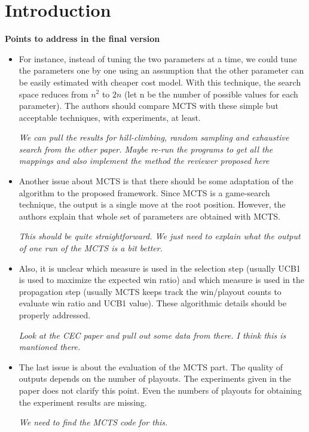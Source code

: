\documentclass[smallextended]{svjour3}
\begin{document}
\section{Introduction}

\textbf{Points to address in the final version}
\begin{itemize}
    \item For instance, instead of tuning the two parameters at a time, we could tune the parameters one by one using an assumption that the other parameter can be easily estimated with cheaper cost model. With this technique, the search space reduces from $n^2$ to $2n$ (let n be the number of possible values for each parameter).  The authors should compare MCTS with these simple but acceptable techniques, with experiments, at least.
    
    \emph{We can pull the results for hill-climbing, random sampling and exhaustive search from the other paper. Maybe re-run the programs to get all the mappings and also implement the method the reviewer proposed here}
    
    \item Another issue about MCTS is that there should be some adaptation of the algorithm to the proposed framework. Since MCTS is a game-search technique, the output is a single move at the root position.  However, the authors explain that whole set of parameters are obtained with MCTS.
    
    \emph{This should be quite straightforward. We just need to explain what the output of one run of the MCTS is a bit better.}
    
    \item Also, it
is unclear which measure is used in the selection step (usually UCB1 is used to maximize the expected win ratio) and which measure is used in the propagation step (usually MCTS keeps track the win/playout counts to evaluate win ratio and UCB1 value).  These algorithmic details should be properly addressed.

    \emph{Look at the CEC paper and pull out some data from there. I think this is mantioned there.}
    
    \item The last issue is about the evaluation of the MCTS part.  The quality of outputs depends on the number of playouts. The experiments given in the paper does not clarify this point.  Even the numbers of playouts for obtaining the experiment results are missing.
    
    \emph{We need to find the MCTS code for this.}
    
\end{itemize}
\end{document}
